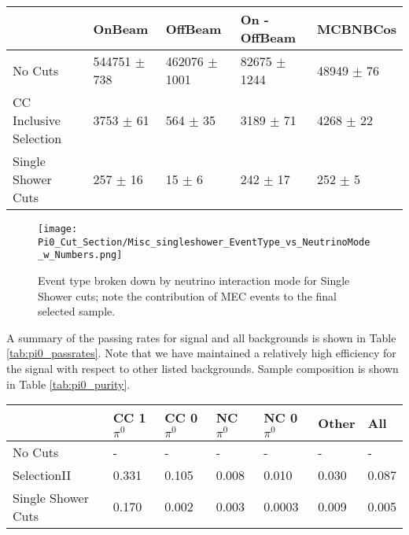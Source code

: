 \begin{table}[H] 
 \centering
 \begin{tabular}{| l | l | l | l | l |}
  \hline
   & OnBeam & OffBeam & On - OffBeam & MCBNBCos \\ [0.1ex] \hline
No Cuts & 544751 $\pm$ 738 & 462076 $\pm$ 1001 & 82675 $\pm$ 1244 & 48949 $\pm$ 76 \\ 
CC Inclusive Selection & 3753 $\pm$ 61 & 564 $\pm$ 35  & 3189 $\pm$ 71 & 4268 $\pm$ 22  \\ 
Single Shower Cuts & 257 $\pm$ 16 & 15 $\pm$ 6 & 242 $\pm$ 17 & 252 $\pm$ 5  \\ \hline
\end{tabular}
 \end{table}


\begin{figure}[H]
\centering
\texttt{[image: Pi0\_Cut\_Section/Misc\_singleshower\_EventType\_vs\_NeutrinoMode\_w\_Numbers.png]}
\caption{ Event type broken down by neutrino interaction mode for Single Shower cuts; note the contribution of MEC events to the final selected sample. }
\label{fig:physics_singleshower_inttype}
\end{figure}


\par A summary of the passing rates for signal and all backgrounds is shown in Table \ref{tab:pi0_passrates}.  Note that we have maintained a relatively high efficiency for the signal with respect to other listed backgrounds. Sample composition is shown in Table \ref{tab:pi0_purity}. 

\begin{table}[H]
\centering
{}
 \begin{tabular}{| l | l | l |l|l|l|l|}
 \hline
 & CC 1$\pi^0$ & CC 0$\pi^0$ & NC $\pi^0$ & NC 0$\pi^0$ & Other & All \\ [0.1ex] \hline
No Cuts & - & - & - & - & - & -\\
SelectionII & 0.331 & 0.105 & 0.008 & 0.010 & 0.030 & 0.087 \\ 
Single Shower Cuts & 0.170 & 0.002 & 0.003 & 0.0003 & 0.009 & 0.005 \\ \hline
\end{tabular}
\end{table}

